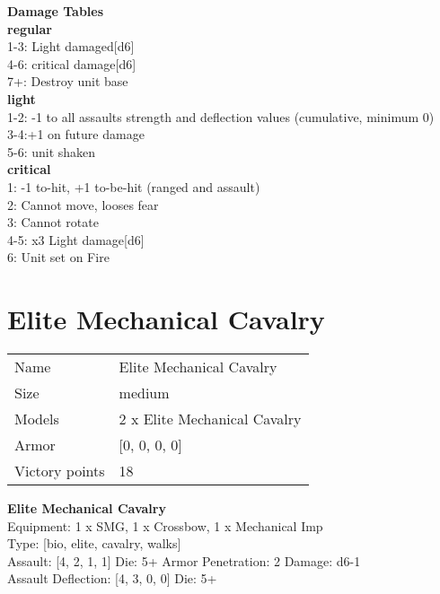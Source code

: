 {\bf Damage Tables} \\
 {\bf regular } \\
1-3: Light damaged[d6] \\
4-6: critical damage[d6] \\
7+: Destroy unit base \\
 {\bf light } \\
1-2: -1 to all assaults strength and deflection values (cumulative, minimum 0) \\
3-4:+1 on future damage \\
5-6: unit shaken \\
 {\bf critical } \\
1: -1 to-hit, +1 to-be-hit (ranged and assault) \\
2: Cannot move, looses fear \\
3: Cannot rotate \\
4-5: x3 Light damage[d6] \\
6: Unit set on Fire \\










\pagebreak\pagebreak

\section{ Elite Mechanical Cavalry }

\begin{tabular}{ll}
  Name & Elite Mechanical Cavalry \\
  Size & medium\\
  Models & 2 x Elite Mechanical Cavalry\\
  Armor & [0, 0, 0, 0]\\
  Victory points & 18\\
\end{tabular}



{\bf Elite Mechanical Cavalry } \\
Equipment: 1 x SMG, 1 x Crossbow, 1 x Mechanical Imp \\
Type: [bio, elite, cavalry, walks] \\

Assault: [4, 2, 1, 1] Die: 5+ Armor Penetration: 2 Damage: d6-1 \\
Assault Deflection: [4, 3, 0, 0] Die: 5+\\
\indent  

